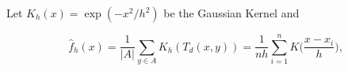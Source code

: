Let  $K_h(x) = \exp( -x^2/h^2)$ be the Gaussian Kernel and

\[
    \hat{f}_h(x) = \frac{1}{|A|}\sum_{ y \in A} K_h (T_d(x,y))= \frac{1}{nh} \sum_{i=1}^n K\Big(\frac{x-x_i}{h}\Big),
  \]